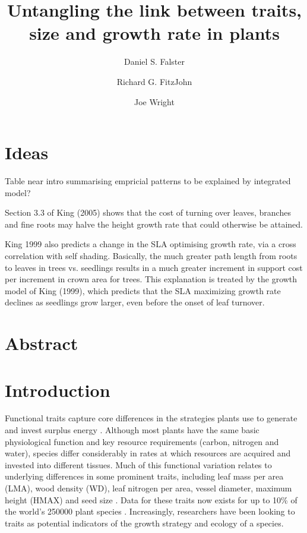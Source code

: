 \documentclass[12pt, a4paper]{article}
\title{\LARGE Untangling the link between traits, size and growth rate in plants}
\author[1]{Daniel S. Falster}
\author[1]{Richard G. FitzJohn}
\author[2]{Joe Wright}
\affil[1]{{\footnotesize Biological Sciences, Macquarie University, North Ryde, NSW 2109, Australia}}
\affil[2]{{\footnotesize Center for Tropical Forest Science, Smithsonian Tropical Research Institute, Panama, Republic of Panama}}
\date{\vspace{-3em}}
\begin{document}
\maketitle
\thispagestyle{empty} %

\section{Ideas}\label{abstract}

Table near intro summarising empricial patterns to be explained by integrated model?

Section 3.3 of King (2005) shows that the cost of turning over leaves, branches and fine roots may halve the height growth rate that could otherwise be attained.

King 1999 also predicts a change in the SLA optimising growth rate, via a cross correlation with self shading. Basically, the much greater path length from roots to leaves in trees vs. seedlings results in a much greater increment in support cost per increment in crown area for trees. This explanation is treated by the growth model of King (1999), which predicts that the SLA maximizing growth rate declines as seedlings grow larger, even before the onset of leaf turnover.

\section{Abstract}\label{abstract}

\section{Introduction}\label{introduction}

Functional traits capture core differences in the strategies
plants use to generate and invest surplus energy
 \citep{wright-2004, chave-2009, westoby-2002}.
Although most plants have the same basic physiological function
and key resource requirements (carbon, nitrogen and water), species differ considerably in
rates at which resources are acquired and invested into different tissues.
Much of this functional variation relates to underlying
differences in some prominent traits, including leaf
mass per area (LMA), wood density (WD), leaf nitrogen per area, vessel
diameter,  maximum  height (HMAX) and seed size  \citep{wright-2004,chave-2009}.
Data for these traits now exists for up to 10\% of the world's 250000 plant species
\citep{cornwell-2014}. Increasingly, researchers have been looking to traits
as potential indicators of the growth strategy and ecology of a species.
\end{document}
